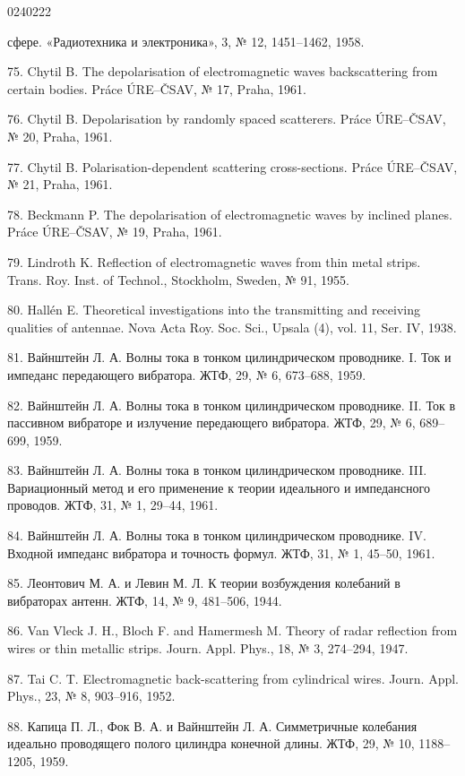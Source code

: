 \begin{scanpage}{0240}{222}
{\cyrillicfont\small
\noindent сфере. «Радиотехника и электроника», 3, № 12, 1451--1462, 1958.\par
75. Chytil B. The depolarisation of electromagnetic waves backscattering from certain bodies. Práce ÚRE--ČSAV, № 17, Praha, 1961.\par
76. Chytil B. Depolarisation by randomly spaced scatterers. Práce ÚRE--ČSAV, № 20, Praha, 1961.\par
77. Chytil B. Polarisation-dependent scattering cross-sections. Práce ÚRE--ČSAV, № 21, Praha, 1961.\par
78. Beckmann P. The depolarisation of electromagnetic waves by inclined planes. Práce ÚRE--ČSAV, № 19, Praha, 1961.\par
79. Lindroth K. Reflection of electromagnetic waves from thin metal strips. Trans. Roy. Inst. of Technol., Stockholm, Sweden, № 91, 1955.\par
80. Hallén E. Theoretical investigations into the transmitting and receiving qualities of antennae. Nova Acta Roy. Soc. Sci., Upsala (4), vol. 11, Ser. IV, 1938.\par
81. Вайнштейн Л. А. Волны тока в тонком цилиндрическом проводнике. I. Ток и импеданс передающего вибратора. ЖТФ, 29, № 6, 673--688, 1959.\par
82. Вайнштейн Л. А. Волны тока в тонком цилиндрическом проводнике. II. Ток в пассивном вибраторе и излучение передающего вибратора. ЖТФ, 29, № 6, 689--699, 1959.\par
83. Вайнштейн Л. А. Волны тока в тонком цилиндрическом проводнике. III. Вариационный метод и его применение к теории идеального и импедансного проводов. ЖТФ, 31, № 1, 29--44, 1961.\par
84. Вайнштейн Л. А. Волны тока в тонком цилиндрическом проводнике. IV. Входной импеданс вибратора и точность формул. ЖТФ, 31, № 1, 45--50, 1961.\par
85. Леонтович М. А. и Левин М. Л. К теории возбуждения колебаний в вибраторах антенн. ЖТФ, 14, № 9, 481--506, 1944.\par
86. Van Vleck J. H., Bloch F. and Hamermesh M. Theory of radar reflection from wires or thin metallic strips. Journ. Appl. Phys., 18, № 3, 274--294, 1947.\par
87. Tai C. T. Electromagnetic back-scattering from cylindrical wires. Journ. Appl. Phys., 23, № 8, 903--916, 1952.\par
88. Капица П. Л., Фок В. А. и Вайнштейн Л. А. Симметричные колебания идеально проводящего полого цилиндра конечной длины. ЖТФ, 29, № 10, 1188--1205, 1959.\par
}
\end{scanpage}
